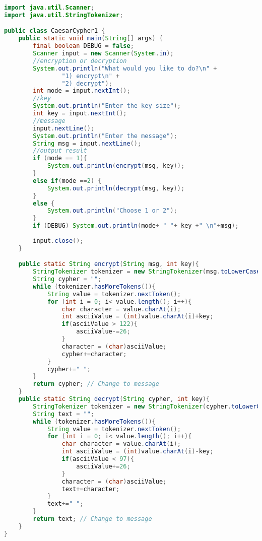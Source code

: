 \documentclass{article}
\begin{document}
\begin{lstlisting}[language=java]
    import java.util.Scanner;
import java.util.StringTokenizer;

public class CaesarCypher1 {
    public static void main(String[] args) {
        final boolean DEBUG = false;
        Scanner input = new Scanner(System.in);
        //encryption or decryption
        System.out.println("What would you like to do?\n" +
                "1) encrypt\n" +
                "2) decrypt");
        int mode = input.nextInt();
        //key
        System.out.println("Enter the key size");
        int key = input.nextInt();
        //message
        input.nextLine();
        System.out.println("Enter the message");
        String msg = input.nextLine();
        //output result
        if (mode == 1){
            System.out.println(encrypt(msg, key));
        }
        else if(mode ==2) {
            System.out.println(decrypt(msg, key));
        }
        else {
            System.out.println("Choose 1 or 2");
        }
        if (DEBUG) System.out.println(mode+ " "+ key +" \n"+msg);
        
        input.close();
    }

    public static String encrypt(String msg, int key){
        StringTokenizer tokenizer = new StringTokenizer(msg.toLowerCase(), " ");
        String cypher = "";
        while (tokenizer.hasMoreTokens()){
            String value = tokenizer.nextToken();
            for (int i = 0; i< value.length(); i++){
                char character = value.charAt(i);
                int asciiValue = (int)value.charAt(i)+key;
                if(asciiValue > 122){
                    asciiValue-=26;
                }
                character = (char)asciiValue;
                cypher+=character;
            }
            cypher+=" ";
        }
        return cypher; // Change to message
    }
    public static String decrypt(String cypher, int key){
        StringTokenizer tokenizer = new StringTokenizer(cypher.toLowerCase(), " ");
        String text = "";
        while (tokenizer.hasMoreTokens()){
            String value = tokenizer.nextToken();
            for (int i = 0; i< value.length(); i++){
                char character = value.charAt(i);
                int asciiValue = (int)value.charAt(i)-key;
                if(asciiValue < 97){
                    asciiValue+=26;
                }
                character = (char)asciiValue;
                text+=character;
            }
            text+=" ";
        }
        return text; // Change to message
    }
}
\end{lstlisting}
\end{document}
